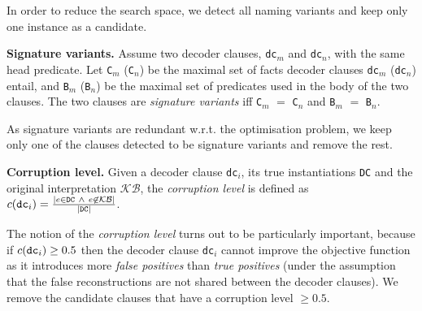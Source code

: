 


In order to reduce the search space, we detect all naming variants and keep only one instance as a candidate.


\begin{definition}
\textbf{Signature variants.}
Assume two decoder clauses, \texttt{dc}$_m$ and \texttt{dc}$_n$, with the same head predicate.
Let \texttt{C}$_m$ (\texttt{C}$_n$) be the maximal set of facts decoder clauses \texttt{dc}$_m$ (\texttt{dc}$_n$) entail, and \texttt{B}$_m$ (\texttt{B}$_n$) be the maximal set of predicates used in the body of the two clauses.
The two clauses are \textit{signature variants} iff \texttt{C}$_m$ $=$ \texttt{C}$_n$ and \texttt{B$_m$} $=$ \texttt{B$_n$}.
\end{definition}

As signature variants are redundant w.r.t. the optimisation problem, we keep only one of the clauses detected to be signature variants and remove the rest.


\begin{definition}
\textbf{Corruption level.}
Given a decoder clause \texttt{dc}$_i$, its true instantiations \texttt{DC} and the original interpretation $\mathcal{KB}$, the \textit{corruption level} is defined as $c(\text{\texttt{dc}}_i) = \frac{|e \in \texttt{DC}\ \wedge\ e \not \in \mathcal{KB}|}{|\text{\texttt{DC}}|}$. 
\end{definition}

The notion of the \textit{corruption level} turns out to be particularly important, because if $c(\text{\texttt{dc}}_i) \geq 0.5$ then the decoder clause \texttt{dc}$_i$ cannot improve the objective function as it introduces more \textit{false positives} than \textit{true positives} (under the assumption that the false reconstructions are not shared between the decoder clauses).
We remove the candidate clauses that have a corruption level $\geq 0.5$.


